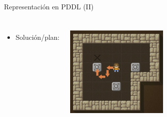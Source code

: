 \documentclass{beamer}
\begin{document}
\begin{frame}{Representación en PDDL (II)}
    \begin{columns}
    \begin{itemize}
        \item Solución/plan:
        
    \end{itemize}
    
    \includegraphics[width=5cm,height=5cm]{sokoban2}
    \end{columns}
\end{frame}

\end{document}
